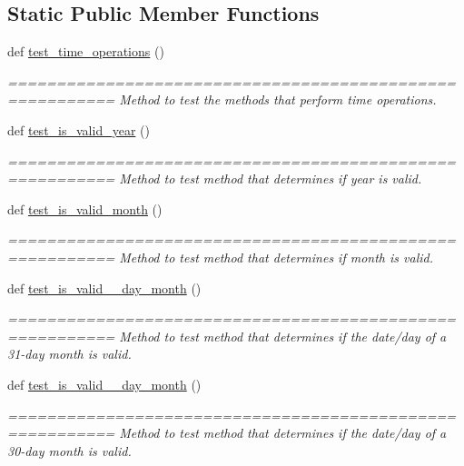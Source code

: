 \subsection*{Static Public Member Functions}
\begin{DoxyCompactItemize}
\item 
def \hyperlink{classutilities_1_1date__time__processing__tester_1_1date__time__operations__tester_a024182086c48b718cc794b100501eb79}{test\+\_\+time\+\_\+operations} ()
\begin{DoxyCompactList}\small\item\em ========================================================= Method to test the methods that perform time operations. \end{DoxyCompactList}\item 
def \hyperlink{classutilities_1_1date__time__processing__tester_1_1date__time__operations__tester_ae745c61827bc1d30d5c964b4d9586343}{test\+\_\+is\+\_\+valid\+\_\+year} ()
\begin{DoxyCompactList}\small\item\em ========================================================= Method to test method that determines if year is valid. \end{DoxyCompactList}\item 
def \hyperlink{classutilities_1_1date__time__processing__tester_1_1date__time__operations__tester_ae3d0fc5e01b44ebe36ef28464f1f755a}{test\+\_\+is\+\_\+valid\+\_\+month} ()
\begin{DoxyCompactList}\small\item\em ========================================================= Method to test method that determines if month is valid. \end{DoxyCompactList}\item 
def \hyperlink{classutilities_1_1date__time__processing__tester_1_1date__time__operations__tester_a6ee9fbb6e07f1ca66334315e61876d8e}{test\+\_\+is\+\_\+valid\+\_\+\_\+day\+\_\+month} ()
\begin{DoxyCompactList}\small\item\em ========================================================= Method to test method that determines if the date/day of a 31-\/day month is valid. \end{DoxyCompactList}\item 
def \hyperlink{classutilities_1_1date__time__processing__tester_1_1date__time__operations__tester_a1ffc03785cad6313ef55b291e1cbb3d9}{test\+\_\+is\+\_\+valid\+\_\+\_\+day\+\_\+month} ()
\begin{DoxyCompactList}\small\item\em ========================================================= Method to test method that determines if the date/day of a 30-\/day month is valid. \end{DoxyCompactList}\item 

\end{DoxyCompactItemize}
